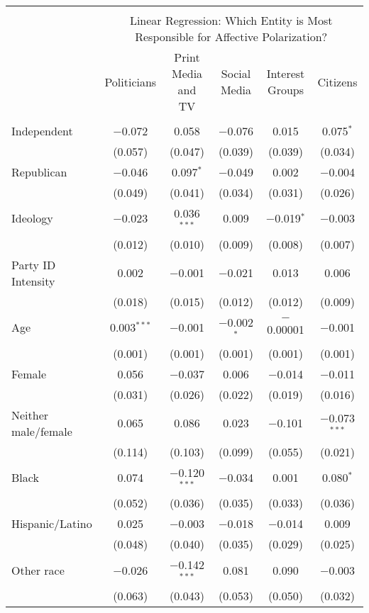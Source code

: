 
\begin{tabular}{@{\extracolsep{5pt}}lccccc} 
\\[-1.8ex]\hline 
\hline \\[-1.8ex] 
 & \multicolumn{5}{c}{Linear Regression: Which Entity is Most Responsible for Affective Polarization?} \\ 
\cline{2-6} 
 & Politicians & Print Media and TV & Social Media & Interest Groups & Citizens \\ 
\hline \\[-1.8ex] 
 Independent & $-$0.072 & 0.058 & $-$0.076 & 0.015 & 0.075$^{*}$ \\ 
  & (0.057) & (0.047) & (0.039) & (0.039) & (0.034) \\ 
  Republican & $-$0.046 & 0.097$^{*}$ & $-$0.049 & 0.002 & $-$0.004 \\ 
  & (0.049) & (0.041) & (0.034) & (0.031) & (0.026) \\ 
  Ideology & $-$0.023 & 0.036$^{***}$ & 0.009 & $-$0.019$^{*}$ & $-$0.003 \\ 
  & (0.012) & (0.010) & (0.009) & (0.008) & (0.007) \\ 
  Party ID Intensity & 0.002 & $-$0.001 & $-$0.021 & 0.013 & 0.006 \\ 
  & (0.018) & (0.015) & (0.012) & (0.012) & (0.009) \\ 
  Age & 0.003$^{***}$ & $-$0.001 & $-$0.002$^{*}$ & $-$0.00001 & $-$0.001 \\ 
  & (0.001) & (0.001) & (0.001) & (0.001) & (0.001) \\ 
  Female & 0.056 & $-$0.037 & 0.006 & $-$0.014 & $-$0.011 \\ 
  & (0.031) & (0.026) & (0.022) & (0.019) & (0.016) \\ 
  Neither male/female & 0.065 & 0.086 & 0.023 & $-$0.101 & $-$0.073$^{***}$ \\ 
  & (0.114) & (0.103) & (0.099) & (0.055) & (0.021) \\ 
  Black & 0.074 & $-$0.120$^{***}$ & $-$0.034 & 0.001 & 0.080$^{*}$ \\ 
  & (0.052) & (0.036) & (0.035) & (0.033) & (0.036) \\ 
  Hispanic/Latino & 0.025 & $-$0.003 & $-$0.018 & $-$0.014 & 0.009 \\ 
  & (0.048) & (0.040) & (0.035) & (0.029) & (0.025) \\ 
  Other race & $-$0.026 & $-$0.142$^{***}$ & 0.081 & 0.090 & $-$0.003 \\ 
  & (0.063) & (0.043) & (0.053) & (0.050) & (0.032) \\ 

\end{tabular}
